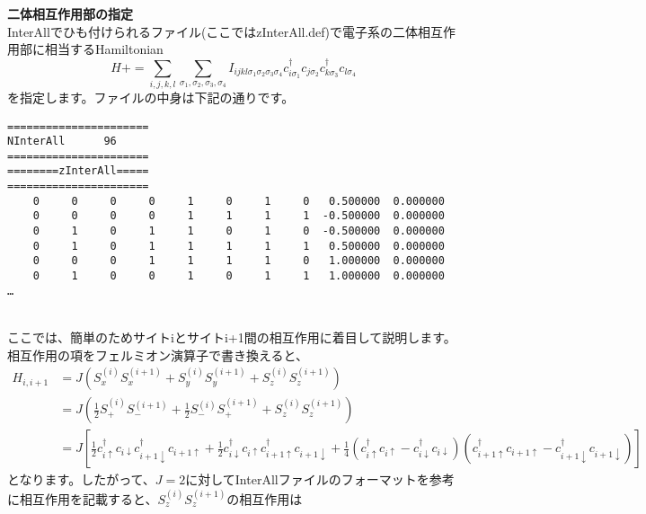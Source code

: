 \begin{description}
\item {\bf 二体相互作用部の指定}\\
InterAllでひも付けられるファイル(ここではzInterAll.def)で電子系の二体相互作用部に相当するHamiltonian
\begin{equation}
H+=\sum_{i,j,k,l}\sum_{\sigma_1,\sigma_2, \sigma_3, \sigma_4}
I_{ijkl\sigma_1\sigma_2\sigma_3\sigma_4}c_{i\sigma_1}^{\dagger}c_{j\sigma_2}c_{k\sigma_3}^{\dagger}c_{l\sigma_4}
\end{equation}
を指定します。ファイルの中身は下記の通りです。\\
\begin{minipage}{16cm}
\begin{screen}
\begin{verbatim}
====================== 
NInterAll      96  
====================== 
========zInterAll===== 
====================== 
    0     0     0     0     1     0     1     0   0.500000  0.000000
    0     0     0     0     1     1     1     1  -0.500000  0.000000
    0     1     0     1     1     0     1     0  -0.500000  0.000000
    0     1     0     1     1     1     1     1   0.500000  0.000000
    0     0     0     1     1     1     1     0   1.000000  0.000000
    0     1     0     0     1     0     1     1   1.000000  0.000000
…
\end{verbatim}
\end{screen}
\end{minipage}
~\\
ここでは、簡単のためサイトiとサイトi+1間の相互作用に着目して説明します。相互作用の項をフェルミオン演算子で書き換えると、
\begin{align}
H_{i,i+1}&=J(S_x^{(i)}S_x^{(i+1)}+S_y^{(i)}S_y^{(i+1)}+S_z^{(i)}S_z^{(i+1)}) \nonumber\\
&=J \left( \frac{1}{2}S_+^{(i)}S_-^{(i+1)}+\frac{1}{2}S_-^{(i)}S_+^{(i+1)}+S_z^{(i)}S_z^{(i+1)} \right) \nonumber\\
&=J \left[ \frac{1}{2}c_{i\uparrow}^{\dag}c_{i\downarrow}c_{i+1\downarrow}^{\dag}c_{i+1\uparrow}+\frac{1}{2}c_{i\downarrow}^{\dag}c_{i\uparrow}c_{i+1\uparrow}^{\dag}c_{i+1\downarrow}+\frac{1}{4}(c_{i\uparrow}^{\dag}c_{i\uparrow}-c_{i\downarrow}^{\dag}c_{i\downarrow})(c_{i+1\uparrow}^{\dag}c_{i+1\uparrow}-c_{i+1\downarrow}^{\dag}c_{i+1\downarrow}) \right] \nonumber 
\end{align}
となります。したがって、$J=2$に対してInterAllファイルのフォーマットを参考に相互作用を記載すると、$S_z^{(i)}S_z^{(i+1)}$の相互作用は\\
\begin{minipage}{16cm}

\end{minipage}
\end{description}
